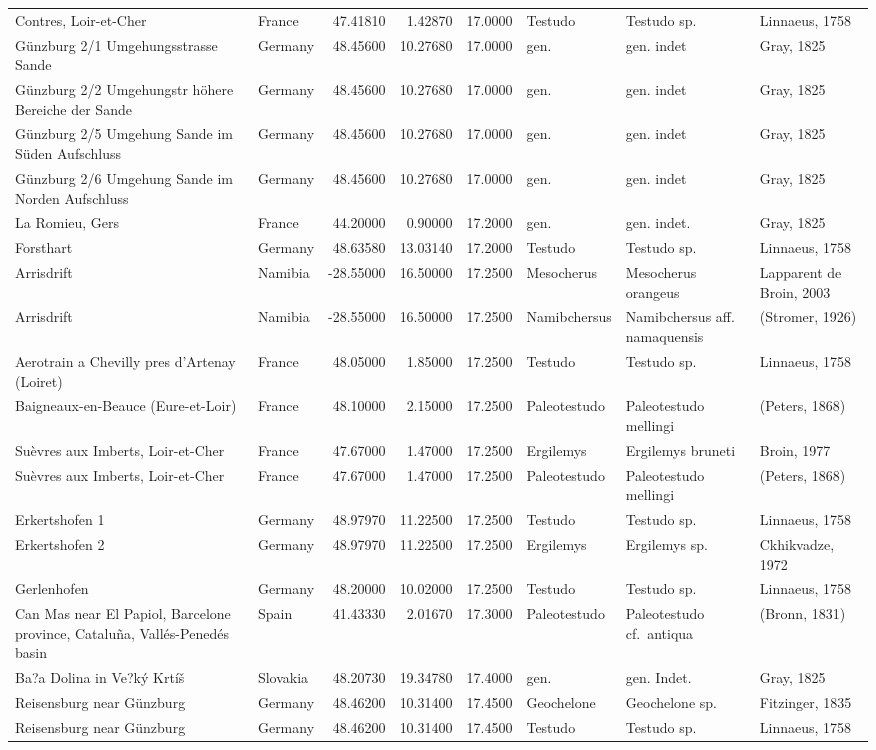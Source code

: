 \documentclass[]{article}
\begin{document}
\begin{longtable}[]{@{}llrrrlll@{}}
Contres, Loir-et-Cher & France & 47.41810 & 1.42870 & 17.0000 & Testudo
& Testudo sp. & Linnaeus, 1758\tabularnewline
Günzburg 2/1 Umgehungsstrasse Sande & Germany & 48.45600 & 10.27680 &
17.0000 & gen. & gen. indet & Gray, 1825\tabularnewline
Günzburg 2/2 Umgehungstr höhere Bereiche der Sande & Germany & 48.45600
& 10.27680 & 17.0000 & gen. & gen. indet & Gray, 1825\tabularnewline
Günzburg 2/5 Umgehung Sande im Süden Aufschluss & Germany & 48.45600 &
10.27680 & 17.0000 & gen. & gen. indet & Gray, 1825\tabularnewline
Günzburg 2/6 Umgehung Sande im Norden Aufschluss & Germany & 48.45600 &
10.27680 & 17.0000 & gen. & gen. indet & Gray, 1825\tabularnewline
La Romieu, Gers & France & 44.20000 & 0.90000 & 17.2000 & gen. & gen.
indet. & Gray, 1825\tabularnewline
Forsthart & Germany & 48.63580 & 13.03140 & 17.2000 & Testudo & Testudo
sp. & Linnaeus, 1758\tabularnewline
Arrisdrift & Namibia & -28.55000 & 16.50000 & 17.2500 & Mesocherus &
Mesocherus orangeus & Lapparent de Broin, 2003\tabularnewline
Arrisdrift & Namibia & -28.55000 & 16.50000 & 17.2500 & Namibchersus &
Namibchersus aff. namaquensis & (Stromer, 1926)\tabularnewline
Aerotrain a Chevilly pres d'Artenay (Loiret) & France & 48.05000 &
1.85000 & 17.2500 & Testudo & Testudo sp. & Linnaeus,
1758\tabularnewline
Baigneaux-en-Beauce (Eure-et-Loir) & France & 48.10000 & 2.15000 &
17.2500 & Paleotestudo & Paleotestudo mellingi & (Peters,
1868)\tabularnewline
Suèvres aux Imberts, Loir-et-Cher & France & 47.67000 & 1.47000 &
17.2500 & Ergilemys & Ergilemys bruneti & Broin, 1977\tabularnewline
Suèvres aux Imberts, Loir-et-Cher & France & 47.67000 & 1.47000 &
17.2500 & Paleotestudo & Paleotestudo mellingi & (Peters,
1868)\tabularnewline
Erkertshofen 1 & Germany & 48.97970 & 11.22500 & 17.2500 & Testudo &
Testudo sp. & Linnaeus, 1758\tabularnewline
Erkertshofen 2 & Germany & 48.97970 & 11.22500 & 17.2500 & Ergilemys &
Ergilemys sp. & Ckhikvadze, 1972\tabularnewline
Gerlenhofen & Germany & 48.20000 & 10.02000 & 17.2500 & Testudo &
Testudo sp. & Linnaeus, 1758\tabularnewline
Can Mas near El Papiol, Barcelone province, Cataluña, Vallés-Penedés
basin & Spain & 41.43330 & 2.01670 & 17.3000 & Paleotestudo &
Paleotestudo cf.~antiqua & (Bronn, 1831)\tabularnewline
Ba?a Dolina in Ve?ký Krtíš & Slovakia & 48.20730 & 19.34780 & 17.4000 &
gen. & gen. Indet. & Gray, 1825\tabularnewline
Reisensburg near Günzburg & Germany & 48.46200 & 10.31400 & 17.4500 &
Geochelone & Geochelone sp. & Fitzinger, 1835\tabularnewline
Reisensburg near Günzburg & Germany & 48.46200 & 10.31400 & 17.4500 &
Testudo & Testudo sp. & Linnaeus, 1758\tabularnewline

\end{longtable}
\end{document}
